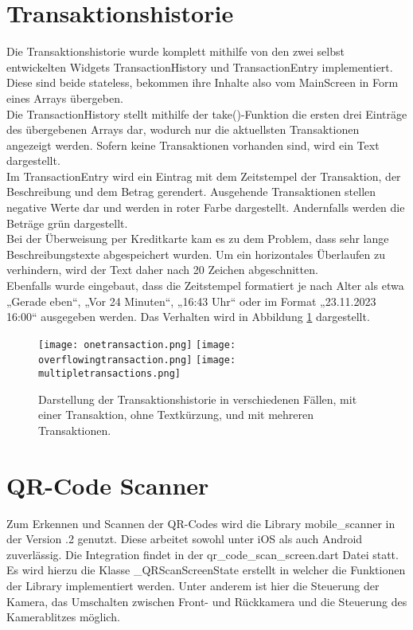 \section{Transaktionshistorie}
Die Transaktionshistorie wurde komplett mithilfe von den zwei selbst entwickelten Widgets TransactionHistory und TransactionEntry implementiert.
Diese sind beide stateless, bekommen ihre Inhalte also vom MainScreen in Form eines Arrays übergeben.\\
Die TransactionHistory stellt mithilfe der take()-Funktion die ersten drei Einträge des übergebenen Arrays dar, wodurch nur die aktuellsten Transaktionen angezeigt werden.
Sofern keine Transaktionen vorhanden sind, wird ein Text dargestellt.\\
Im TransactionEntry wird ein Eintrag mit dem Zeitstempel der Transaktion, der Beschreibung und dem Betrag gerendert.
Ausgehende Transaktionen stellen negative Werte dar und werden in roter Farbe dargestellt.
Andernfalls werden die Beträge grün dargestellt.\\
Bei der Überweisung per Kreditkarte kam es zu dem Problem, dass sehr lange Beschreibungstexte abgespeichert wurden.
Um ein horizontales Überlaufen zu verhindern, wird der Text daher nach 20 Zeichen abgeschnitten.\\
Ebenfalls wurde eingebaut, dass die Zeitstempel formatiert je nach Alter als etwa „Gerade eben“, „Vor 24 Minuten“, „16:43 Uhr“ oder im Format „23.11.2023 16:00“ ausgegeben werden.
Das Verhalten wird in Abbildung \ref{fig:transactionhistory} dargestellt.

\begin{figure}[H]
  \centering
  \texttt{[image: onetransaction.png]}
  \texttt{[image: overflowingtransaction.png]}
  \texttt{[image: multipletransactions.png]}
  \caption{Darstellung der Transaktionshistorie in verschiedenen Fällen, mit einer Transaktion, ohne Textkürzung, und mit mehreren Transaktionen.}
  \label{fig:transactionhistory}
\end{figure}

\section{QR-Code Scanner}

Zum Erkennen und Scannen der QR-Codes wird die Library \glqq mobile\_scanner\grqq{} in der Version .2\grqq{} genutzt.
Diese arbeitet sowohl unter iOS als auch Android zuverlässig.
Die Integration findet in der \glqq qr\_code\_scan\_screen.dart\grqq{} Datei statt.
Es wird hierzu die Klasse \glqq \_QRScanScreenState\grqq{} erstellt in welcher die Funktionen der Library implementiert werden.
Unter anderem ist hier die Steuerung der Kamera, das Umschalten zwischen Front- und Rückkamera und die Steuerung des Kamerablitzes möglich.

